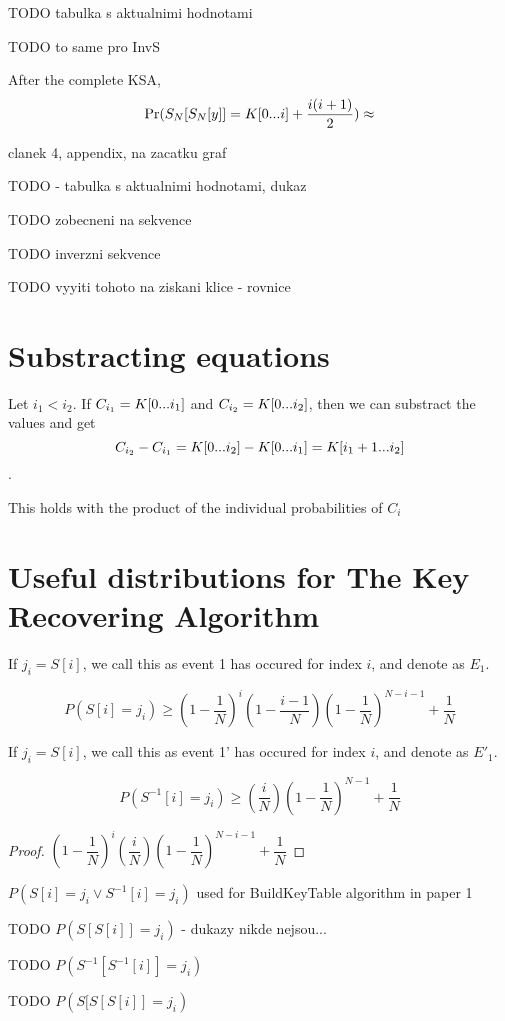 TODO tabulka s aktualnimi hodnotami 

TODO to same pro InvS


\begin{thm}
	After the complete KSA, 
	\[  \Pr(S_{N}[S_{N}[y]] = K[{0}...{i}] + \dfrac{i(i+1)}{2}) \approx  \]
	
	clanek 4, appendix, na zacatku graf
\end{thm}

TODO - tabulka s aktualnimi hodnotami, dukaz




TODO zobecneni na sekvence


TODO inverzni sekvence

TODO vyyiti tohoto na ziskani klice - rovnice


\section{Substracting equations}

Let $i_{1} < i_{2} $. If $ C_{i_{1}} = K[{0}...{i_{1}}] $ and $ C_{i_{2}} = K[{0}...{i_{2}}] $, then we can substract the values and get
\[ C_{i_{2}} - C_{i_{1}} = K[{0}...{i_{2}}] - K[{0}...{i_{1}}] = K[{i_{1} + 1}...{i_{2}}]	\].

This holds with the product of the individual probabilities of $ C_{i} $


\section{Useful distributions for The Key Recovering Algorithm}

\begin{defn}
If $ j_{i} = S[i] $, we call this as event 1 has occured for index $ i $, and denote as $ E_{1} $.
\end{defn}

\begin{thm}
\[	P(S[i] = j_{i}) \geq (1-\dfrac{1}{N})^{i}(1-\dfrac{i-1}{N})(1-\dfrac{1}{N})^{N-i-1}+ \dfrac{1}{N} \]
\end{thm}

\begin{defn}
	If $ j_{i} = S[i] $, we call this as event 1' has occured for index $ i $, and denote as $ E'_{1} $.
\end{defn}

\begin{thm}
	\[	P(S^{-1}[i] = j_{i}) \geq (\dfrac{i}{N})(1-\dfrac{1}{N})^{N-1}+ \dfrac{1}{N}\]
\end{thm}


\begin{proof}
		$ (1-\dfrac{1}{N})^{i}(\dfrac{i}{N})(1-\dfrac{1}{N})^{N-i-1}+ \dfrac{1}{N} $
\end{proof}

\begin{thm}
	$ P(S[i] = j_{i} \vee S^{-1}[i] = j_{i}) $ used for BuildKeyTable algorithm in paper 1
\end{thm}


TODO $ P(S[S[i]] = j_{i}) $ - dukazy nikde nejsou...

TODO $ P(S^{-1}[S^{-1}[i]] = j_{i}) $

TODO $ P(S[S[S[i]] = j_{i}) $



